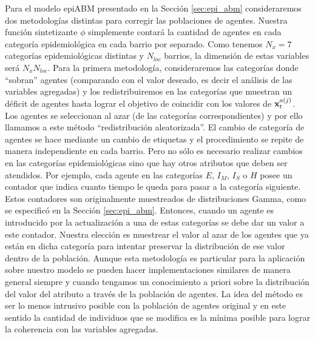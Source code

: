 Para el modelo epiABM presentado en la Sección \ref{sec:epi_abm} consideraremos dos metodologías distintas para corregir las poblaciones de agentes. Nuestra función sintetizante $\phi$ simplemente contará la cantidad de agentes en cada categoría epidemiológica en cada barrio por separado. Como tenemos $N_x = 7$ categorías epidemiológicas distintas y $N_{loc}$ barrios, la dimensión de estas variables será $N_x N_{loc}$. Para la primera metodología, consideraremos las categorías donde ``sobran'' agentes (comparando con el valor deseado, es decir el análisis de las variables agregadas) y los redistribuiremos en las categorías que muestran un déficit de agentes hasta lograr el objetivo de coincidir con los valores de $\mathbf{x}_t^{a(j)}$. Los agentes se seleccionan al azar (de las categorías correspondientes) y por ello llamamos a este método ``redistribución aleatorizada''. El cambio de categoría de agentes se hace mediante un cambio de etiquetas y el procedimiento se repite de manera independiente en cada barrio. Pero no sólo es necesario realizar cambios en las categorías epidemiológicas sino que hay otros atributos que deben ser atendidos. Por ejemplo, cada agente en las categorías $E$, $I_M$, $I_S$ o $H$ posee un contador que indica cuanto tiempo le queda para pasar a la categoría siguiente. Estos contadores son originalmente muestreados de distribuciones Gamma, como se especificó en la Sección \ref{sec:epi_abm}. Entonces, cuando un agente es introducido por la actualización a una de estas categorías se debe dar un valor a este contador. Nuestra elección es muestrear el valor al azar de los agentes que ya están en dicha categoría para intentar preservar la distribución de ese valor dentro de la población. Aunque esta metodología es particular para la aplicación sobre nuestro modelo se pueden hacer implementaciones similares de manera general siempre y cuando tengamos un conocimiento a priori sobre la distribución del valor del atributo a través de la población de agentes. La idea del método es ser lo menos intrusivo posible con la población de agentes original y en este sentido la cantidad de individuos que se modifica es la mínima posible para lograr la coherencia con las variables agregadas.

